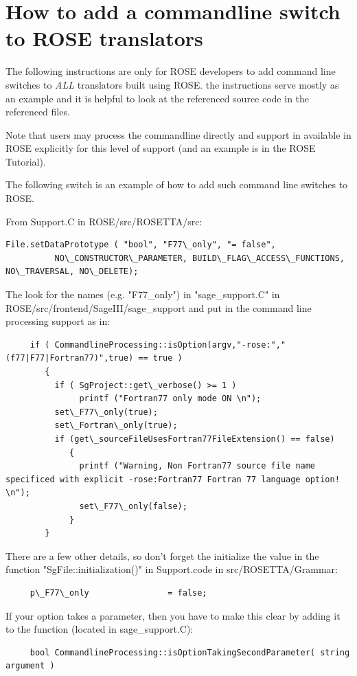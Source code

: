 \newpage

\section{How to add a commandline switch to ROSE translators}
   The following instructions are only for ROSE developers to add 
command line switches to {\em ALL} translators built using ROSE.
the instructions serve mostly as an example and it is helpful to look
at the referenced source code in the referenced files.

Note that users may process the commandline directly and support in
available in ROSE explicitly for this level of support (and an example is
in the ROSE Tutorial).

The following switch is an example of how to add such command line switches to ROSE.

From Support.C in ROSE/src/ROSETTA/src:
{
\indent
\begin{verbatim}
File.setDataPrototype ( "bool", "F77\_only", "= false",
          NO\_CONSTRUCTOR\_PARAMETER, BUILD\_FLAG\_ACCESS\_FUNCTIONS, NO\_TRAVERSAL, NO\_DELETE);
\end{verbatim} 
}

The look for the names (e.g. "F77\_only") in "sage\_support.C" in ROSE/src/frontend/SageIII/sage\_support
and put in the command line processing support as in:
{
\indent
\begin{verbatim}
     if ( CommandlineProcessing::isOption(argv,"-rose:","(f77|F77|Fortran77)",true) == true )
        {
          if ( SgProject::get\_verbose() >= 1 )
               printf ("Fortran77 only mode ON \n");
          set\_F77\_only(true);
          set\_Fortran\_only(true);
          if (get\_sourceFileUsesFortran77FileExtension() == false)
             {
               printf ("Warning, Non Fortran77 source file name specificed with explicit -rose:Fortran77 Fortran 77 language option! \n");
               set\_F77\_only(false);
             }
        }
\end{verbatim} 
}

There are a few other details, so don't forget the initialize
the value in the function "SgFile::initialization()" in Support.code
in src/ROSETTA/Grammar:
{
\indent
\begin{verbatim}
     p\_F77\_only                = false;
\end{verbatim} 
}

If your option takes a parameter, then you have to make this clear by adding it to the
function (located in sage\_support.C):
{
\indent
\begin{verbatim}
     bool CommandlineProcessing::isOptionTakingSecondParameter( string argument )
\end{verbatim} 
}

